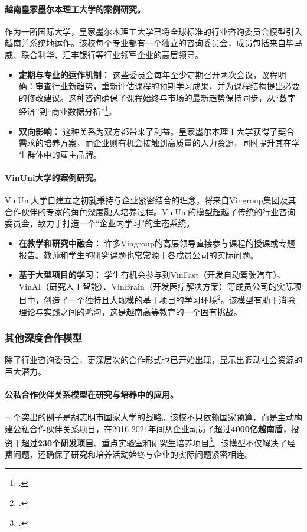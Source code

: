 \paragraph{越南皇家墨尔本理工大学的案例研究。} 作为一所国际大学，皇家墨尔本理工大学已将全球标准的行业咨询委员会模型引入越南并系统地运作。该校每个专业都有一个独立的咨询委员会，成员包括来自毕马威、联合利华、汇丰银行等行业领军企业的高层领导。
\begin{itemize}
    \item \textbf{定期与专业的运作机制：} 这些委员会每年至少定期召开两次会议，议程明确：审查行业新趋势，重新评估课程的预期学习成果，并为课程结构提出必要的修改建议。这种咨询确保了课程始终与市场的最新趋势保持同步，从“数字经济”到“商业数据分析”\footcite{rmit_iab_2023}。
    \item \textbf{双向影响：} 这种关系为双方都带来了利益。皇家墨尔本理工大学获得了契合需求的培养方案，而企业则有机会接触到高质量的人力资源，同时提升其在学生群体中的雇主品牌。
\end{itemize}

\paragraph{VinUni大学的案例研究。} VinUni大学自建立之初就秉持与企业紧密结合的理念，将来自Vingroup集团及其合作伙伴的专家的角色深度融入培养过程。VinUni的模型超越了传统的行业咨询委员会，致力于打造一个“企业内学习”的生态系统。
\begin{itemize}
    \item \textbf{在教学和研究中融合：} 许多Vingroup的高层领导直接参与课程的授课或专题报告。教师和学生的研究课题也常常源于各成员公司的实际问题。
    \item \textbf{基于大型项目的学习：} 学生有机会参与到VinFast（开发自动驾驶汽车）、VinAI（研究人工智能）、VinBrain（开发医疗解决方案）等成员公司的实际项目中，创造了一个独特且大规模的基于项目的学习环境\footcite{vinuni_industry_collaboration_2023}。该模型有助于消除理论与实践之间的鸿沟，这是越南高等教育的一个固有挑战。
\end{itemize}

\subsubsection{其他深度合作模型}
除了行业咨询委员会，更深层次的合作形式也已开始出现，显示出调动社会资源的巨大潜力。

\paragraph{公私合作伙伴关系模型在研究与培养中的应用。} 一个突出的例子是胡志明市国家大学的战略。该校不只依赖国家预算，而是主动构建公私合作伙伴关系项目，在2016-2021年间从企业动员了超过\textbf{4000亿越南盾}，投资于超过\textbf{230个研发项目}、重点实验室和研究生培养项目\footcite{vnuhcm_ppp_2022}。该模型不仅解决了经费问题，还确保了研究和培养活动始终与企业的实际问题紧密相连。

